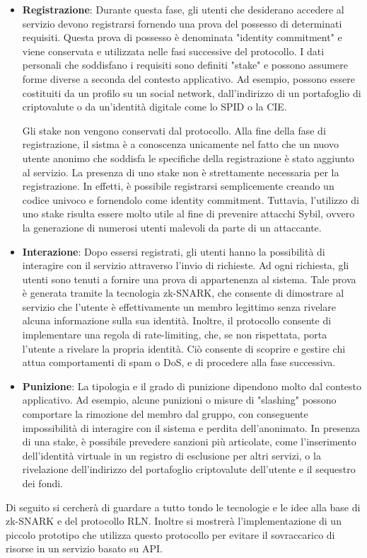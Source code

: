\begin{itemize}
    \item \textbf{Registrazione}: Durante questa fase, gli utenti che desiderano accedere al servizio devono
    registrarsi fornendo una prova del possesso di determinati requisiti. Questa prova di possesso è denominata
    "identity commitment" e viene conservata e utilizzata nelle fasi successive del protocollo. I dati personali che
    soddisfano i requisiti sono definiti "stake" e possono assumere forme diverse a seconda del contesto applicativo. Ad
    esempio, possono essere costituiti da un profilo su un social network, dall'indirizzo di un portafoglio di
    criptovalute o da un'identità digitale come lo SPID o la CIE.

    Gli stake non vengono conservati dal protocollo. Alla fine della fase di registrazione, il sistma è a conoscenza
    unicamente nel fatto che un nuovo utente anonimo che soddisfa le specifiche della registrazione è
    stato aggiunto al servizio. La presenza di uno stake non è strettamente necessaria per la registrazione.
    In effetti, è possibile registrarsi semplicemente creando un codice univoco e fornendolo come identity commitment.
    Tuttavia, l'utilizzo di uno stake risulta essere molto utile al fine di prevenire attacchi Sybil, ovvero la
    generazione di numerosi utenti malevoli da parte di un attaccante.
    \item \textbf{Interazione}: Dopo essersi registrati, gli utenti hanno la possibilità di interagire con il servizio
    attraverso l'invio di richieste. Ad ogni richiesta, gli utenti sono tenuti a fornire una prova di appartenenza al
    sistema. Tale prova è generata tramite la tecnologia zk-SNARK, che consente di dimostrare al servizio che l'utente è
    effettivamente un membro legittimo senza rivelare alcuna informazione sulla sua identità. Inoltre, il protocollo
    consente di implementare una regola di rate-limiting, che, se non rispettata, porta l'utente a rivelare la propria
    identità. Ciò consente di scoprire e gestire chi attua comportamenti di spam o DoS, e di procedere alla fase
    successiva.
    \item \textbf{Punizione}: La tipologia e il grado di punizione dipendono molto dal contesto applicativo. Ad esempio,
    alcune punizioni o misure di "slashing" possono comportare la rimozione del membro dal gruppo, con conseguente
    impossibilità di interagire con il sistema e perdita dell'anonimato. In presenza di una stake, è possibile
    prevedere sanzioni più articolate, come l'inserimento dell'identità virtuale in un registro di esclusione per altri
    servizi, o la rivelazione dell'indirizzo del portafoglio criptovalute dell'utente e il sequestro dei fondi.
\end{itemize}
Di seguito si cercherà di guardare a tutto tondo le tecnologie e le idee alla base di zk-SNARK e del protocollo RLN.
Inoltre si mostrerà l'implementazione di un piccolo prototipo che utilizza questo protocollo per evitare il sovraccarico
di risorse in un servizio basato su API.
